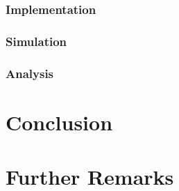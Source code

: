 \documentclass[12pt]{article}
\begin{document}
    \subsubsection{Implementation}
    \subsubsection{Simulation}
    \subsubsection{Analysis}
    \section{Conclusion}
    \section{Further Remarks}
    \printunsrtglossary[type=symbols,style=long,title={List of Symbols and Constants}]
    \newpage 
    \printbibliography
\end{document}
